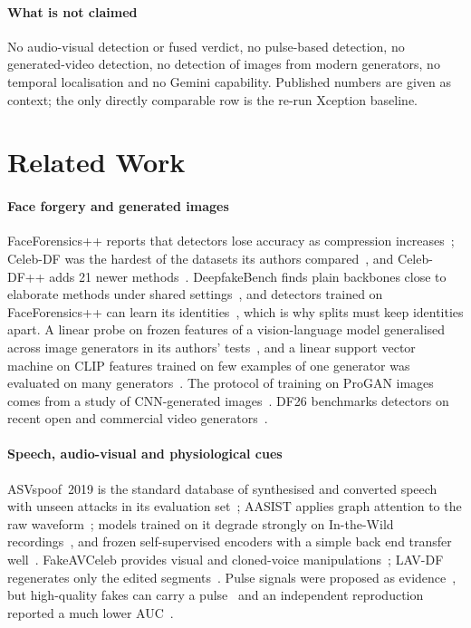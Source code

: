 \documentclass[conference,a4paper]{IEEEtran_nodash}
\begin{document}
\paragraph*{What is not claimed}
No audio-visual detection or fused verdict, no pulse-based detection, no
generated-video detection, no detection of images from modern generators, no
temporal localisation and no Gemini capability. Published numbers are given as
context; the only directly comparable row is the re-run Xception baseline.

\section{Related Work}\label{sec:related}

\paragraph*{Face forgery and generated images}
FaceForensics++ reports that detectors lose accuracy as compression
increases~\cite{rossler2019faceforensics}; Celeb-DF was the hardest of the
datasets its authors compared~\cite{li2020celebdf}, and Celeb-DF++ adds 21 newer
methods~\cite{li2025celebdfpp}. DeepfakeBench finds plain backbones close to
elaborate methods under shared settings~\cite{yan2023deepfakebench}, and detectors
trained on FaceForensics++ can learn its identities~\cite{dong2023implicit}, which
is why splits must keep identities apart. A linear probe on frozen features of a
vision-language model generalised across image generators in its authors'
tests~\cite{ojha2024universal}, and a linear support vector machine on CLIP
features trained on few examples of one generator was evaluated on many
generators~\cite{cozzolino2024raising}. The protocol of training on ProGAN images
comes from a study of CNN-generated images~\cite{wang2020cnnspot}. DF26 benchmarks
detectors on recent open and commercial video generators~\cite{shykula2026df26}.

\paragraph*{Speech, audio-visual and physiological cues}
ASVspoof~2019 is the standard database of synthesised and converted speech with
unseen attacks in its evaluation set~\cite{wang2020asvspoof}; AASIST applies graph
attention to the raw waveform~\cite{jung2021aasist}; models trained on it degrade
strongly on In-the-Wild recordings~\cite{muller2022inthewild}, and frozen
self-supervised encoders with a simple back end transfer
well~\cite{pascu2024generalisable}. FakeAVCeleb provides visual and cloned-voice
manipulations~\cite{khalid2022fakeavceleb}; LAV-DF regenerates only the edited
segments~\cite{cai2022lavdf}. Pulse signals were proposed as
evidence~\cite{ciftci2020fakecatcher}, but high-quality fakes can carry a
pulse~\cite{seibold2025heart} and an independent reproduction reported a much
lower AUC~\cite{harraq2026physio}.
\end{document}
